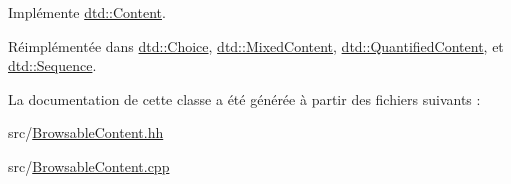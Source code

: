 Implémente \hyperlink{classdtd_1_1_content_acaa15daa3a3a2cf11632c4c93dc2cf37}{dtd::Content}.



Réimplémentée dans \hyperlink{classdtd_1_1_choice_ad0302d4e2b758025b430014fe8c20046}{dtd::Choice}, \hyperlink{classdtd_1_1_mixed_content_a675bca1039d5dd8cced7fddb856428fd}{dtd::MixedContent}, \hyperlink{classdtd_1_1_quantified_content_a83733f23442035bdbcd976723ed753a4}{dtd::QuantifiedContent}, et \hyperlink{classdtd_1_1_sequence_a585eecddf1104ba42a15944ee4ff4b19}{dtd::Sequence}.



La documentation de cette classe a été générée à partir des fichiers suivants :\begin{DoxyCompactItemize}
\item 
src/\hyperlink{_browsable_content_8hh}{BrowsableContent.hh}\item 
src/\hyperlink{_browsable_content_8cpp}{BrowsableContent.cpp}\end{DoxyCompactItemize}
